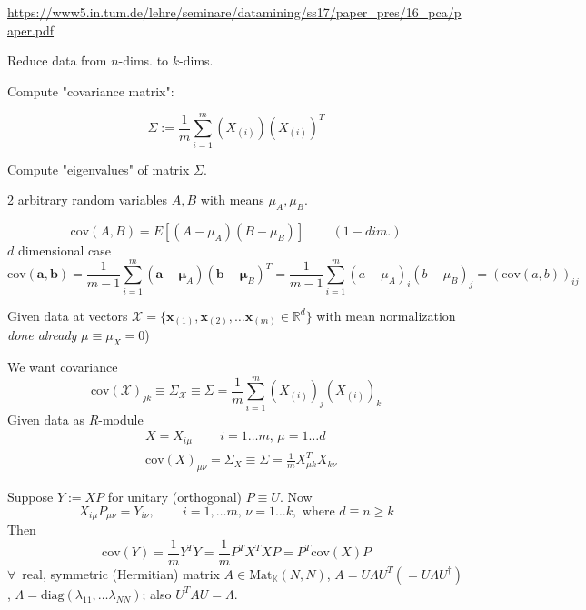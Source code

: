 \documentclass[10pt]{amsart}
\begin{document}
\begin{multicols*}{2}
\url{https://www5.in.tum.de/lehre/seminare/datamining/ss17/paper_pres/16_pca/paper.pdf}

Reduce data from $n$-dims. to $k$-dims.  

Compute "covariance matrix":

\begin{equation}
\Sigma := \frac{1}{m} \sum_{i=1}^m (X_{(i)})( X_{(i)})^T
\end{equation}

Compute "eigenvalues" of matrix $\Sigma$.  

2 arbitrary random variables $A,B$ with means $\mu_A,\mu_B$.  

\[
\text{cov}(A,B) = E[(A-\mu_A) (B-\mu_B)]  \qquad \, (1-dim.)
\]
$d$ dimensional case
\begin{equation}
\text{cov}(\mathbf{a},\mathbf{b}) = \frac{1}{m-1} \sum_{i=1}^m  (\mathbf{a}-\mathbf{\mu}_A) (\mathbf{b}- \mathbf{\mu}_B)^T = \frac{1}{m-1} \sum_{i=1}^m ( a - \mu_A)_i (b-\mu_B)_j = (\text{cov}(a,b))_{ij}
\end{equation}

Given data at vectors $\mathcal{X} = \lbrace \mathbf{x}_{(1)}, \mathbf{x}_{(2)}, \dots \mathbf{x}_{(m)} \in \mathbb{R}^d \rbrace$ with mean normalization \emph{done already }  $\mu  \equiv \mu_X = 0 $)

We want covariance 
\begin{equation}
	\text{cov}(\mathcal{X})_{jk} \equiv \Sigma_{\mathcal{X}} \equiv \Sigma = \frac{1}{m} \sum_{i=1}^m (X_{(i)} )_j (X_{(i)})_k 
\end{equation}
Given data as $R$-module
\begin{equation}
\begin{aligned}
	& X = X_{ i \mu} \qquad \, i = 1\dots m , \, \mu= 1\dots d \\ 
	& \text{cov}(X)_{\mu \nu } = \Sigma_X \equiv \Sigma = \frac{1}{m} X^T_{ \mu k } X_{k \nu}
\end{aligned}
\end{equation}

Suppose $Y:= XP$ for unitary (orthogonal) $P\equiv U$.  Now 
\[
X_{i\mu} P_{\mu \nu } = Y_{i\nu} , \qquad \, i = 1,\dots m , \, \nu = 1\dots k , \text{ where } d \equiv n \geq k
\]
Then
\begin{equation}
	\text{cov}(Y) = \frac{1}{m} Y^T Y = \frac{1}{m} P^T X^T XP = P^T \text{cov}{(X)} P
\end{equation}
$\forall \, $ real, symmetric (Hermitian) matrix $A\in \text{Mat}_{\mathbb{K}}(N,N)$, $A = U\Lambda U^T (=U\Lambda U^{\dag})$, $\Lambda = \text{diag}(\lambda_{11}, \dots \lambda_{NN} )$; also $U^T AU = \Lambda$.  


\end{multicols*}
\end{document}

